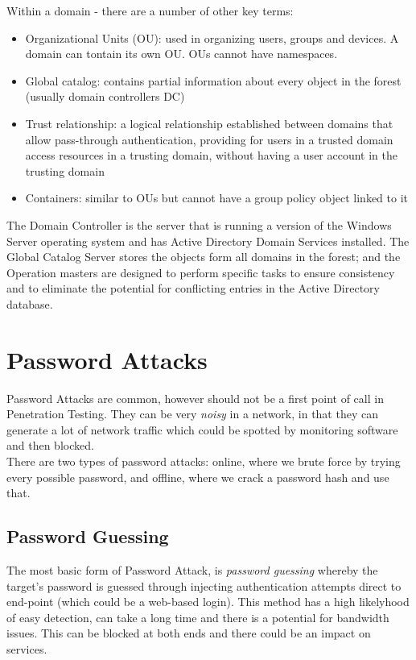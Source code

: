 Within a domain - there are a number of other key terms:
\begin{itemize}
    \item Organizational Units (OU): used in organizing users, groups and devices. A domain can tontain its own OU. OUs cannot have namespaces.
    \item Global catalog: contains partial information about every object in the forest (usually domain controllers DC)
    \item Trust relationship: a logical relationship established between domains that allow pass-through authentication, providing for users in a trusted domain access resources in a trusting domain, without having a user account in the trusting domain
    \item Containers: similar to OUs but cannot have a group policy object linked to it
\end{itemize}

The Domain Controller is the server that is running a version of the Windows Server operating system and has Active Directory Domain Services installed. The Global Catalog Server stores the objects form all domains in the forest; and the Operation masters are designed to perform specific tasks to ensure consistency and to eliminate the potential for conflicting entries in the Active Directory database. 


\section{Password Attacks}
Password Attacks are common, however should not be a first point of call in Penetration Testing. They can be very \textit{noisy} in a network, in that they can generate a lot of network traffic which could be spotted by monitoring software and then blocked.\\

There are two types of password attacks: online, where we brute force by trying every possible password, and offline, where we crack a password hash and use that. 

\subsection{Password Guessing}
The most basic form of Password Attack, is \textit{password guessing} whereby the target's password is guessed through injecting authentication attempts direct to end-point (which could be a web-based login). This method has a high likelyhood of easy detection, can take a long time and there is a potential for bandwidth issues. This can be blocked at both ends and there could be an impact on services.

